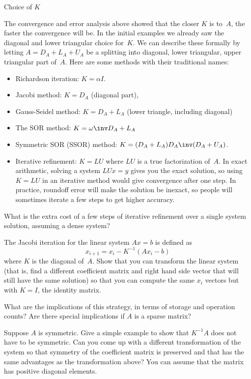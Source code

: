  {Choice of $K$}
\label{sec:preconditioner}

The convergence and error analysis above showed that the closer $K$ is
to~$A$, the faster the  convergence will be.
%
In the initial examples we already saw the diagonal and lower
triangular choice for~$K$. We can describe these formally by letting
$A=D_A+L_A+U_A$ be a splitting into diagonal, lower triangular, upper
triangular part of~$A$. Here are some methods with their traditional names:
\begin{itemize}
\item Richardson iteration: $K=\alpha I$.
\item Jacobi method: $K=D_A$ (diagonal part),
\item Gauss-Seidel method: $K=D_A+L_A$ (lower triangle, including
  diagonal)
\item The \ac{SOR} method: $K=\omega\inv D_A+ L_A$
\item Symmetric SOR (SSOR) method: $K=(D_A+L_A)D_A\inv(D_A+U_A)$.
\item Iterative refinement: $K=LU$ where
  $LU$ is a true factorization of~$A$. In exact arithmetic, solving a
  system $LUx=y$ gives you the exact solution, so using $K=LU$ in an
  iterative method would give convergence after one step. In practice,
  roundoff error will make the solution be inexact, so people will
  sometimes iterate a few steps to get higher accuracy.
\end{itemize}
\begin{exercise}
  What is the extra cost of a few steps of iterative refinement over a
  single system solution, assuming a dense system?
\end{exercise}

\begin{exercise}
  The Jacobi iteration for the linear system $Ax=b$ is defined as
\[ x_{i+1}=x_i-K^{-1}(Ax_i-b) \]
where $K$ is the diagonal of~$A$. Show that you can transform the
linear system (that is, find a different coefficient matrix and right
hand side vector that will still have the same solution) so that you
can compute the same $x_i$ vectors but with $K=I$, the identity
matrix.

What are the implications of this strategy, in terms of storage and
operation counts? Are there special implications if $A$ is a sparse
matrix?

Suppose $A$ is symmetric. Give a simple example to show that $K^{-1}A$
does not have to be symmetric. Can you come up with a different
transformation of the system so that symmetry of the coefficient
matrix is preserved and that
has the same advantages as the transformation above? You can
assume that the matrix has positive diagonal elements.
\end{exercise}

